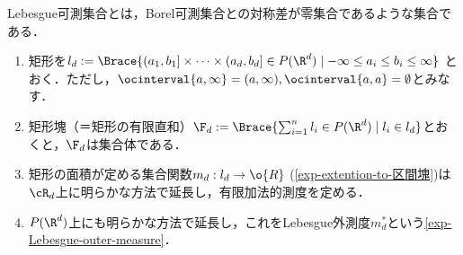 \documentclass[uplatex, dvipdfmx]{jsreport}
\begin{document}
\begin{tcolorbox}[colframe=ForestGreen, colback=ForestGreen!10!white,breakable,colbacktitle=ForestGreen!40!white,coltitle=black,fonttitle=\bfseries\sffamily,
title=]
    Lebesgue可測集合とは，Borel可測集合との対称差が零集合であるような集合である．
\end{tcolorbox}

\begin{notation}[矩形／区間，矩形塊]\mbox{}
    \begin{enumerate}
        \item 矩形を$l_d:=\Brace{(a_1,b_1]\times\cdots\times(a_d,b_d]\in P(\R^d)\mid-\infty\le a_i\le b_i\le\infty}$
        とおく．ただし，$\ocinterval{a,\infty}=(a,\infty),\ocinterval{a,a}=\emptyset$とみなす．
        \item 矩形塊（＝矩形の有限直和）$\F_d:=\Brace{\sum_{i=1}^nl_i\in P(\R^d)\mid l_i\in l_d}$とおくと，$\F_d$は集合体である．
        \item 矩形の面積が定める集合関数$m_d:l_d\to\o{R}$ (\ref{exp-extention-to-区間塊})は$\cR_d$上に明らかな方法で延長し，有限加法的測度を定める．
        \item $P(\R^d)$上にも明らかな方法で延長し，これをLebesgue外測度$m^*_d$という\ref{exp-Lebesgue-outer-measure}．
    \end{enumerate}
\end{notation}
\end{document}
